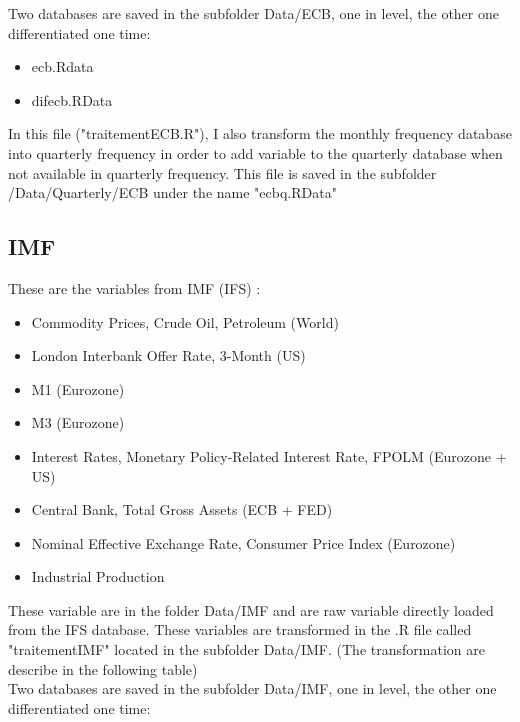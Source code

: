 \documentclass[11pt,a4paper]{article}
\begin{document}
Two databases are saved in the subfolder Data/ECB, one in level, the other one differentiated one time: 

\begin{itemize}
\item ecb.Rdata 
\item difecb.RData 
\end{itemize}

\vspace{0.5cm}

In this file ("traitementECB.R"), I also transform the monthly frequency database into quarterly  frequency in order to add variable to the quarterly database when not available in quarterly frequency. This file is saved in the subfolder /Data/Quarterly/ECB under the name "ecbq.RData" 






\subsection{IMF}

These are the variables from IMF (IFS) :
\begin{itemize}
\item Commodity Prices, Crude Oil, Petroleum (World)
\item London Interbank Offer Rate, 3-Month (US)
\item M1 (Eurozone)
\item M3 (Eurozone)
\item Interest Rates, Monetary Policy-Related Interest Rate, FPOLM (Eurozone + US)
\item Central Bank, Total Gross Assets (ECB + FED)
\item Nominal Effective Exchange Rate, Consumer Price Index (Eurozone)
\item Industrial Production
\end{itemize}

\vspace{0.5cm}

These variable are in the folder Data/IMF and are raw variable directly loaded from the IFS database. These variables are transformed in the .R file called "traitementIMF" located in the subfolder Data/IMF. (The transformation are describe in the following table) \\

Two databases are saved in the subfolder Data/IMF, one in level, the other one differentiated one time: 
\end{document}
